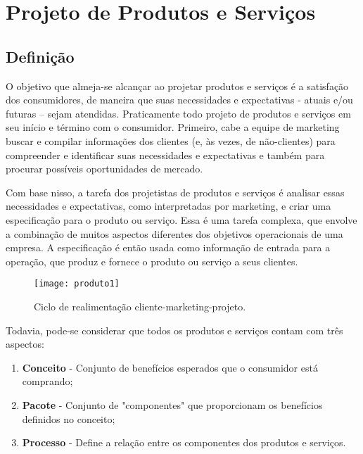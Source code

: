 \chapter[Projeto de Produtos e Serviços]{Projeto de Produtos e Serviços}
\label{chap:produtos}

	\section[Definição]{Definição}
	\label{sec:produtos_definicao}

		O objetivo que almeja-se alcançar ao projetar produtos e serviços é a satisfação dos consumidores, de maneira que suas necessidades e expectativas - atuais e/ou futuras – sejam atendidas. Praticamente todo projeto de produtos e serviços em seu início e término com o consumidor. Primeiro, cabe a equipe de marketing buscar e compilar informações dos clientes (e, às vezes, de não-clientes) para compreender e identificar suas necessidades e expectativas e também para procurar possíveis oportunidades de mercado. 

		Com base nisso, a tarefa dos projetistas de produtos e serviços é analisar essas necessidades e expectativas, como interpretadas por marketing, e criar uma especificação para o produto ou serviço. Essa é uma tarefa complexa, que envolve a combinação de muitos aspectos diferentes dos objetivos operacionais de uma empresa. A especificação é então usada como informação de entrada para a operação, que produz e fornece o produto ou serviço a seus clientes. \cite{slack}

		\begin{figure}[h]
			\centering
			\texttt{[image: produto1]}
			\caption[Ciclo de realimentação cliente-marketing-projeto]{Ciclo de realimentação cliente-marketing-projeto.}
			\label{fig:produto1}
		\end{figure}

		Todavia, pode-se considerar que todos os produtos e serviços contam com três aspectos: 

		\begin{enumerate}
			\item{\textbf{Conceito} - Conjunto de benefícios esperados que o consumidor está comprando;}
			\item{\textbf{Pacote} - Conjunto de "componentes" que proporcionam os benefícios definidos no conceito;}
			\item{\textbf{Processo} - Define a relação entre os componentes dos produtos e serviços.}
		\end{enumerate}

